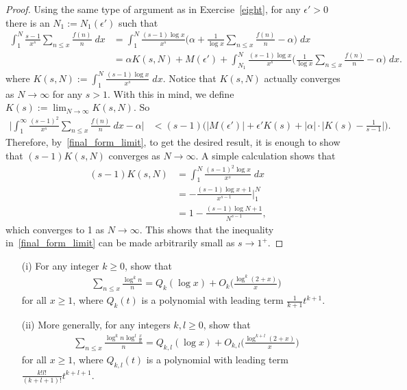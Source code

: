\documentclass[11pt]{article}
\newenvironment{ex}[1]
  {\renewcommand\theinnercustomthm{#1}\innercustomthm}
  {\endinnercustomthm}
\begin{document}
\begin{proof}
Using the same type of argument as in Exercise~\ref{eight}, for any $\epsilon'>0$ there is an $N_1:=N_1(\epsilon')$ such that
\begin{align*}
\int_1^N\frac{s-1}{x^s}\sum_{n\leq x}\frac{f(n)}{n}\;dx &= \int_1^N\frac{(s-1)\log{x}}{x^s}\bigg(\alpha+\frac{1}{\log{x}}\sum_{n\leq x}\frac{f(n)}{n}-\alpha\bigg)\;dx\\ &= \alpha K(s,N)+M(\epsilon')+\int_{N_1}^N\frac{(s-1)\log{x}}{x^s}\bigg(\frac{1}{\log{x}}\sum_{n\leq x}\frac{f(n)}{n}-\alpha\bigg)\;dx.
\end{align*}
where $K(s,N):=\int_{1}^N\frac{(s-1)\log{x}}{x^s}\;dx$. Notice that $K(s,N)$ actually converges as $N\to\infty$ for any $s>1$. With this in mind, we define $K(s):=\lim_{N\to\infty}K(s,N)$. So
\begin{align}
\bigg|\int_1^\infty\frac{(s-1)^2}{x^s}\sum_{n\leq x}\frac{f(n)}{n}\;dx -\alpha\bigg| &< (s-1)\bigg(|M(\epsilon')|+\epsilon ' K(s)+|\alpha|\cdot\bigg|K(s)-\frac{1}{s-1}\bigg|\bigg).\label{final_form_limit}
\end{align}
Therefore, by~\eqref{final_form_limit}, to get the desired result, it is enough to show that $(s-1)K(s,N)$ converges as $N\to\infty$. A simple calculation shows that
\begin{align*}
(s-1)K(s,N) &=\int_1^N\frac{(s-1)^2\log{x}}{x^s}\;dx\\
&= -\frac{(s-1)\log{x}+1}{x^{s-1}}\bigg|_1^N\\
&= 1-\frac{(s-1)\log{N}+1}{N^{s-1}},
\end{align*}
which converges to 1 as $N\to\infty$. This shows that the inequality in~\eqref{final_form_limit} can be made arbitrarily small as $s\to1^+$.
\end{proof}

\begin{ex}{9}\label{nine}
\begin{enumerate}
\item[(i)] For any integer $k\geq 0$, show that
\begin{align*}
\sum_{n\leq x}\frac{\log^k{n}}{n}=Q_k(\log{x})+O_k\bigg(\frac{\log^k{(2+x)}}{x}\bigg)
\end{align*}
for all $x\geq 1$, where $Q_k(t)$ is a polynomial with leading term $\frac{1}{k+1}t^{k+1}$.
\item[(ii)] More generally, for any integers $k,l\geq0$, show that
\begin{align*}
\sum_{n\leq x}\frac{\log^k{n}\log^l{\frac{x}{n}}}{n}=Q_{k,l}(\log{x})+O_{k,l}\bigg(\frac{\log^{k+l}{(2+x)}}{x}\bigg)
\end{align*}
for all $x\geq 1$, where $Q_{k,l}(t)$ is a polynomial with leading term $\frac{k!l!}{(k+l+1)!}t^{k+l+1}$.
\end{enumerate}
\end{ex}
\end{document}

